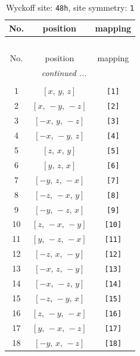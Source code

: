 \documentclass[fleqn,8pt]{jsarticle}
\begin{document}
\begin{longtable}{ccc}
\caption{Wyckoff site: {\tt 48h}, site symmetry: {\tt 1}}
 \\
 \hline \hline
No. & position & mapping \\ \hline \endfirsthead

\multicolumn{2}{l}{\tablename\ \thetable{}} \\
 \hline \hline
No. & position & mapping \\ \hline \endhead

 \hline \hline
\multicolumn{2}{r}{\footnotesize\it continued ...} \\ \endfoot

 \hline \hline
\multicolumn{2}{r}{} \\ \endlastfoot

1 & $\left[ x,\, y,\, z \right]$ & {\tt [1]} \\ \hline
2 & $\left[ x,\, - y,\, - z \right]$ & {\tt [2]} \\ \hline
3 & $\left[ - x,\, y,\, - z \right]$ & {\tt [3]} \\ \hline
4 & $\left[ - x,\, - y,\, z \right]$ & {\tt [4]} \\ \hline
5 & $\left[ z,\, x,\, y \right]$ & {\tt [5]} \\ \hline
6 & $\left[ y,\, z,\, x \right]$ & {\tt [6]} \\ \hline
7 & $\left[ - y,\, z,\, - x \right]$ & {\tt [7]} \\ \hline
8 & $\left[ - z,\, - x,\, y \right]$ & {\tt [8]} \\ \hline
9 & $\left[ - y,\, - z,\, x \right]$ & {\tt [9]} \\ \hline
10 & $\left[ z,\, - x,\, - y \right]$ & {\tt [10]} \\ \hline
11 & $\left[ y,\, - z,\, - x \right]$ & {\tt [11]} \\ \hline
12 & $\left[ - z,\, x,\, - y \right]$ & {\tt [12]} \\ \hline
13 & $\left[ - x,\, z,\, - y \right]$ & {\tt [13]} \\ \hline
14 & $\left[ - x,\, - z,\, y \right]$ & {\tt [14]} \\ \hline
15 & $\left[ - z,\, - y,\, x \right]$ & {\tt [15]} \\ \hline
16 & $\left[ z,\, - y,\, - x \right]$ & {\tt [16]} \\ \hline
17 & $\left[ y,\, - x,\, - z \right]$ & {\tt [17]} \\ \hline
18 & $\left[ - y,\, x,\, - z \right]$ & {\tt [18]} \\ \hline

\end{longtable}
\end{document}
